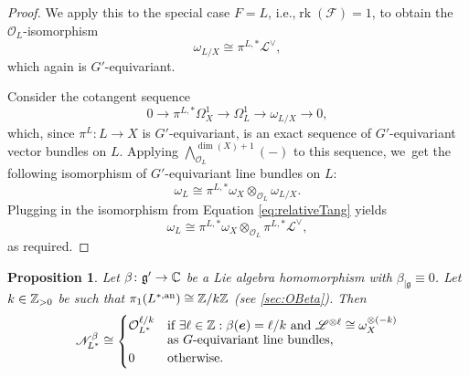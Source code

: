 \documentclass[11pt]{article}
\newcommand{\ie}{i.e.,\xspace}
\newcommand{\bme}{{\boldsymbol{e}}}
\newtheorem{prop}[thm]{Proposition}
\newcommand{\Ell}{\mathscr{L}}
\newcommand{\cO}{\mathcal{O}}\let\O\cO
\newcommand{\frg}{\mathfrak{g}}
\DeclareMathOperator{\rk}{rk}
\newcommand\restr[2]{{#1_{| {#2}}}}
\begin{document}
\begin{proof}
We apply this to the special case $F=L$, \ie $\rk(\mathscr{F})=1$, to obtain the $\cO_L$\nobreakdash-isomorphism
\begin{equation}\label{eq:relativeTang}
\omega_{L/X}\cong \pi^{L,*}\Ell^\vee,
\end{equation}which again is $G'$-equivariant.

Consider the cotangent sequence
\[
0 \to \pi^{L,*} \Omega^1_X \to \Omega^1_L
\to \omega_{L/X}\to 0,
\]
which, since $\pi^L \colon L\to X$ is $G'$-equivariant, is an exact sequence of $G'$-equivariant vector bundles on $L$. Applying $\bigwedge^{\dim(X)+1}_{\cO_L}(-)$ to this sequence, we~get the following isomorphism of $G'$-equivariant line bundles on $L$:
\[
\omega_L \cong \pi^{L,*}\omega_X \otimes_{\cO_L} \omega_{L/X}.
\]
Plugging in the isomorphism from Equation \eqref{eq:relativeTang} yields
\[
\omega_L \cong \pi^{L,*} \omega_X \otimes_{\O_L} \pi^{L,*} \Ell^\vee,
\]
as required.
\end{proof}

\begin{prop} \label{prop:NBetaEqualsOBeta}
Let
$\beta \colon \frg' \to \C$ be a Lie algebra homomorphism with $\restr{\beta}{\frg} \equiv 0$. Let $k \in {\mathbb Z}_{>0}$ be such that $\pi_1(L^{*,\mathrm{an}}) \cong {\mathbb Z}/k{\mathbb Z}$ (see \cref{sec:OBeta}). Then
\[
\mathscr N_{L^*}^\beta \cong 
\begin{cases}
\O_{L^*}^{\ell/k} &\text{if $\exists \ell \in \Z: \beta(\bme) = \ell/k$ and $\Ell^{\otimes \ell} \cong \omega_X^{\otimes (-k)}$} \\[-3pt]
& \text{as $G$-equivariant line bundles,} \\
0 & \text{otherwise.}
\end{cases}
\]
\end{prop}
\end{document}
